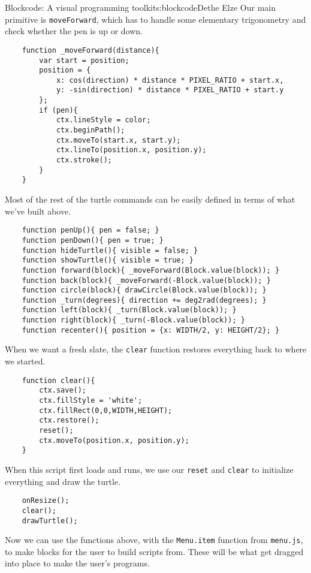 \begin{aosachapter}{Blockcode: A visual programming toolkit}{s:blockcode}{Dethe Elze}
Our main primitive is \texttt{moveForward}, which has to handle some
elementary trigonometry and check whether the pen is up or down.

\begin{verbatim}
    function _moveForward(distance){
        var start = position;
        position = {
            x: cos(direction) * distance * PIXEL_RATIO + start.x,
            y: -sin(direction) * distance * PIXEL_RATIO + start.y
        };
        if (pen){
            ctx.lineStyle = color;
            ctx.beginPath();
            ctx.moveTo(start.x, start.y);
            ctx.lineTo(position.x, position.y);
            ctx.stroke();
        }
    }
\end{verbatim}

Most of the rest of the turtle commands can be easily defined in terms
of what we've built above.

\begin{verbatim}
    function penUp(){ pen = false; }
    function penDown(){ pen = true; }
    function hideTurtle(){ visible = false; }
    function showTurtle(){ visible = true; }
    function forward(block){ _moveForward(Block.value(block)); }
    function back(block){ _moveForward(-Block.value(block)); }
    function circle(block){ drawCircle(Block.value(block)); }
    function _turn(degrees){ direction += deg2rad(degrees); }
    function left(block){ _turn(Block.value(block)); }
    function right(block){ _turn(-Block.value(block)); }
    function recenter(){ position = {x: WIDTH/2, y: HEIGHT/2}; }
\end{verbatim}

When we want a fresh slate, the \texttt{clear} function restores
everything back to where we started.

\begin{verbatim}
    function clear(){
        ctx.save();
        ctx.fillStyle = 'white';
        ctx.fillRect(0,0,WIDTH,HEIGHT);
        ctx.restore();
        reset();
        ctx.moveTo(position.x, position.y);
    }
\end{verbatim}

When this script first loads and runs, we use our \texttt{reset} and
\texttt{clear} to initialize everything and draw the turtle.

\begin{verbatim}
    onResize();
    clear();
    drawTurtle();
\end{verbatim}

Now we can use the functions above, with the \texttt{Menu.item} function
from \texttt{menu.js}, to make blocks for the user to build scripts
from. These will be what get dragged into place to make the user's
programs.


\end{aosachapter}

